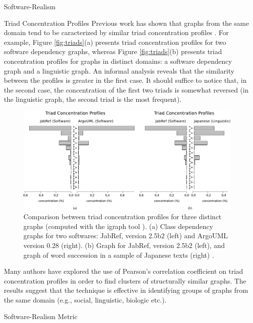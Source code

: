 \documentclass[11pt,twocolumn,a4paper,english]{article}
\begin{document}
\begin{section}{Software-Realism}
\begin{subsection}{Triad Concentration Profiles}
	Previous work has shown that graphs from the same domain tend to be caracterized by similar triad concentration profiles \cite{Milo2002}. For example, Figure \ref{fig:triads}(a) presents triad concentration profiles for two software dependency graphs, whereas Figure \ref{fig:triads}(b) presents triad concentration profiles for graphs in distinct domains: a software dependency graph and a linguistic graph. An informal analysis reveals that the similarity between the profiles is greater in the first case. It should suffice to notice that, in the second case, the concentration of the first two triads is somewhat reversed (in the linguistic graph, the second triad is the most frequent).

	\begin{figure}[htbp]
		\centering
			\includegraphics[scale=1]{figures/tcp}
		\caption{Comparison between triad concentration profiles for three distinct graphs (computed with the igraph tool \cite{igraph}). (a) Class dependency graphs for two softwares: JabRef, version 2.5b2 (left) and ArgoUML version 0.28 (right). (b) Graph for JabRef, version 2.5b2 (left), and graph of word succession in a sample of Japanese texts (right) \cite{Milo2004}.}
		\label{fig:tcp}
	\end{figure}
	
	Many authors \cite{Milo2004,Ma2007,Lin2008} have explored the use of Pearson's correlation coefficient on triad concentration profiles in order to find clusters of structurally similar graphs. The results suggest that the technique is effective in identifying groups of graphs from the same domain (e.g., social, linguistic, biologic etc.).
			
	\end{subsection}
	
\begin{subsection}{Software-Realism Metric}


\end{subsection}
\end{section}
\end{document}

